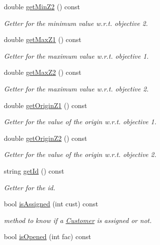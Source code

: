 \begin{DoxyCompactItemize}
double \hyperlink{classBox_ac7e00f6d46cec745f8fb31d85acf478d}{get\-Min\-Z2} () const 
\begin{DoxyCompactList}\small\item\em \-Getter for the minimum value w.\-r.\-t. objective 2. \end{DoxyCompactList}\item 
double \hyperlink{classBox_a0f85e1a40344acb792817d6ea2f1308e}{get\-Max\-Z1} () const 
\begin{DoxyCompactList}\small\item\em \-Getter for the maximum value w.\-r.\-t. objective 1. \end{DoxyCompactList}\item 
double \hyperlink{classBox_a03a7b786519de4fc925fd97799542a64}{get\-Max\-Z2} () const 
\begin{DoxyCompactList}\small\item\em \-Getter for the maximum value w.\-r.\-t. objective 2. \end{DoxyCompactList}\item 
double \hyperlink{classBox_a0edaa4a59c314a6ca2a9df735d62a6a5}{get\-Origin\-Z1} () const 
\begin{DoxyCompactList}\small\item\em \-Getter for the value of the origin w.\-r.\-t. objective 1. \end{DoxyCompactList}\item 
double \hyperlink{classBox_a5cd8a30ba9bf4a46a41e77fdfc160b25}{get\-Origin\-Z2} () const 
\begin{DoxyCompactList}\small\item\em \-Getter for the value of the origin w.\-r.\-t. objective 2. \end{DoxyCompactList}\item 
string \hyperlink{classBox_a6ad1deec58284de4d81ab6fa127403f2}{get\-Id} () const 
\begin{DoxyCompactList}\small\item\em \-Getter for the id. \end{DoxyCompactList}\item 
bool \hyperlink{classBox_a694b80c4886c575f6486593783c5b78d}{is\-Assigned} (int cust) const 
\begin{DoxyCompactList}\small\item\em method to know if a {\ttfamily \hyperlink{classCustomer}{\-Customer}} is assigned or not. \end{DoxyCompactList}\item 
bool \hyperlink{classBox_a4a22004a5cffa8f0e635304fdcb97c84}{is\-Opened} (int fac) const 

\end{DoxyCompactItemize}
